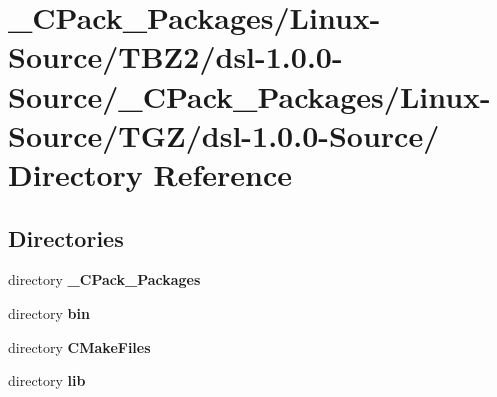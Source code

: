 \section{\_\-CPack\_\-Packages/Linux-\/Source/TBZ2/dsl-\/1.0.0-\/Source/\_\-CPack\_\-Packages/Linux-\/Source/TGZ/dsl-\/1.0.0-\/Source/ Directory Reference}
\label{dir_c6c6715ad10b806737a60dacb5966ddb}
\subsection*{Directories}
\begin{DoxyCompactItemize}
\item 
directory {\bf \_\-CPack\_\-Packages}
\item 
directory {\bf bin}
\item 
directory {\bf CMakeFiles}
\item 
directory {\bf lib}
\end{DoxyCompactItemize}
